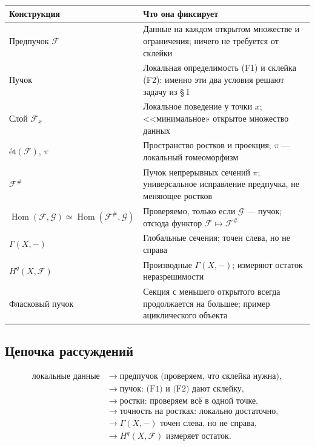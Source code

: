 \documentclass[11pt,b5paper]{article}
\newcommand{\et}{\text{ét}}
\newcommand{\Hom}{\operatorname{Hom}}
\newcommand{\Shv}[1]{\mathscr{#1}}   %
\theoremstyle{plain}
\theoremstyle{definition}
\theoremstyle{remark}
\theoremstyle{definition}
\let\brutsubsection\subsection
\renewcommand{\subsection}{\Needspace{5\baselineskip}\brutsubsection}
\begin{document}
\begin{center}
\renewcommand{\arraystretch}{1.25}
\begin{tabular}{@{}>{\raggedright\arraybackslash}p{}%
                >{\raggedright\arraybackslash}p{}@{}}
\toprule
\textbf{Конструкция} & \textbf{Что она фиксирует} \\
\midrule
Предпучок $\Shv{F}$ & Данные на каждом открытом множестве и
  ограничения; ничего не требуется от склейки \\
Пучок & Локальная определимость (F1) и склейка (F2): именно эти
  два условия решают задачу из \S\,1 \\
Слой $\Shv{F}_x$ & Локальное поведение у точки $x$; <<минимальное»
  открытое множество данных \\
$\et(\Shv{F})$, $\pi$ & Пространство ростков и проекция;
  $\pi$ --- локальный гомеоморфизм \\
$\Shv{F}^{\#}$ & Пучок непрерывных сечений $\pi$; универсальное
  исправление предпучка, не меняющее ростков \\
$\Hom(\Shv{F},\Shv{G})\simeq\Hom(\Shv{F}^{\#},\Shv{G})$ &
  Проверяемо, только если $\Shv{G}$ --- пучок; отсюда
  функтор $\Shv{F}\mapsto\Shv{F}^{\#}$ \\
$\Gamma(X,-)$ & Глобальные сечения; точен слева, но не справа \\
$H^q(X,\Shv{F})$ & Производные $\Gamma(X,-)$; измеряют остаток
  неразрешимости \\
Фласковый пучок & Секция с меньшего открытого всегда продолжается
  на большее; пример ациклического объекта \\
\bottomrule
\end{tabular}
\end{center}

\subsection{Цепочка рассуждений}
\[
\begin{aligned}
\text{локальные данные}
&\longrightarrow\text{предпучок (проверяем, что склейка нужна)},\\
&\longrightarrow\text{пучок: (F1) и (F2) дают склейку},\\
&\longrightarrow\text{ростки: проверяем всё в одной точке},\\
&\longrightarrow\text{точность на ростках: локально достаточно},\\
&\longrightarrow\Gamma(X,-)\text{ точен слева, но не справа},\\
&\longrightarrow H^q(X,\Shv{F})\text{ измеряет остаток}.
\end{aligned}
\]
\end{document}
